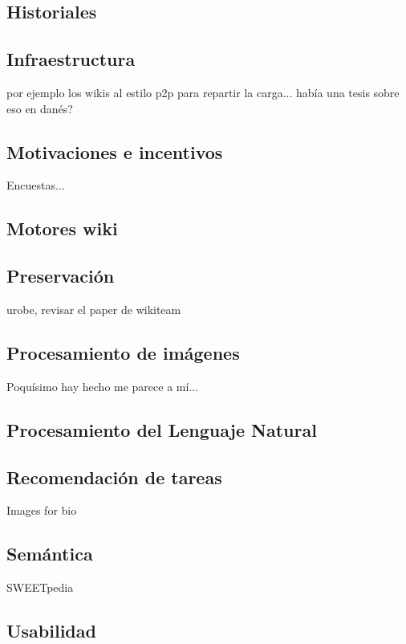 \documentclass[11pt,onecolumn]{article}
\begin{document}
\subsection{Historiales}

\subsection{Infraestructura}

por ejemplo los wikis al estilo p2p para repartir la carga... había una tesis sobre eso en danés?


\subsection{Motivaciones e incentivos}


Encuestas...

\subsection{Motores wiki}


\subsection{Preservación}

urobe, revisar el paper de wikiteam

\subsection{Procesamiento de imágenes}

Poquísimo hay hecho me parece a mí...

\subsection{Procesamiento del Lenguaje Natural}


\subsection{Recomendación de tareas}

Images for bio

\subsection{Semántica}

SWEETpedia

\subsection{Usabilidad}
\end{document}
